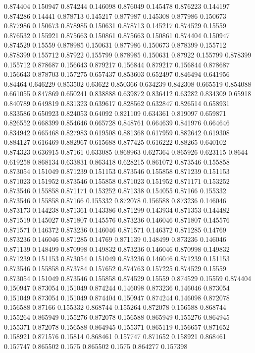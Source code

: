 0.874404 0.150947
0.874244 0.146098
0.876049 0.145478
0.876223 0.144197
0.874286 0.14441
0.878713 0.145217
0.877987 0.145308
0.877986 0.150673
0.877986 0.150673
0.878985 0.150631
0.878713 0.145217
0.874529 0.15559
0.876532 0.155921
0.875663 0.150861
0.875663 0.150861
0.874404 0.150947
0.874529 0.15559
0.878985 0.150631
0.877986 0.150673
0.878399 0.155712
0.878399 0.155712
0.87922 0.155799
0.878985 0.150631
0.87922 0.155799
0.878399 0.155712
0.878687 0.156643
0.879217 0.156844
0.879217 0.156844
0.878687 0.156643
0.878703 0.157275
0.657437 0.853603
0.652497 0.846494
0.641956 0.84464
0.646229 0.853502
0.63622 0.850366
0.634239 0.842308
0.665519 0.854088
0.661055 0.847869
0.650241 0.838888
0.639872 0.836412
0.63282 0.834309
0.65918 0.840789
0.649819 0.831323
0.639617 0.828562
0.632847 0.826514
0.658931 0.833586
0.650923 0.824053
0.64092 0.821109
0.634361 0.819097
0.659871 0.826552
0.668399 0.854646
0.665728 0.848761
0.664639 0.841976
0.664646 0.834942
0.665468 0.827983
0.619508 0.881368
0.617959 0.882642
0.619308 0.884127
0.616469 0.882967
0.615688 0.877425
0.616222 0.88265
0.640102 0.874323
0.636915 0.87161
0.633085 0.868963
0.627364 0.865926
0.623115 0.8644
0.619258 0.868134
0.633831 0.863418
0.628215 0.861072
0.873546 0.155858
0.873054 0.151049
0.871239 0.151153
0.873546 0.155858
0.871239 0.151153
0.871023 0.151952
0.873546 0.155858
0.871023 0.151952
0.871171 0.153252
0.873546 0.155858
0.871171 0.153252
0.871338 0.154055
0.87166 0.155332
0.873546 0.155858
0.87166 0.155332
0.872078 0.156588
0.873236 0.146046
0.873173 0.144238
0.871361 0.143386
0.871299 0.143934
0.871353 0.144482
0.871519 0.145027
0.871807 0.145576
0.873236 0.146046
0.871807 0.145576
0.871571 0.146372
0.873236 0.146046
0.871571 0.146372
0.871285 0.14769
0.873236 0.146046
0.871285 0.14769
0.871139 0.148499
0.873236 0.146046
0.871139 0.148499
0.870998 0.149832
0.873236 0.146046
0.870998 0.149832
0.871239 0.151153
0.873054 0.151049
0.873236 0.146046
0.871239 0.151153
0.873546 0.155858
0.873784 0.157652
0.874763 0.157225
0.874529 0.15559
0.873054 0.151049
0.873546 0.155858
0.874529 0.15559
0.874529 0.15559
0.874404 0.150947
0.873054 0.151049
0.874244 0.146098
0.873236 0.146046
0.873054 0.151049
0.873054 0.151049
0.874404 0.150947
0.874244 0.146098
0.872078 0.156588
0.87166 0.155332
0.868744 0.155264
0.872078 0.156588
0.868744 0.155264
0.865949 0.155276
0.872078 0.156588
0.865949 0.155276
0.864945 0.155371
0.872078 0.156588
0.864945 0.155371
0.865119 0.156657
0.871652 0.158921
0.871576 0.15814
0.868461 0.157747
0.871652 0.158921
0.868461 0.157747
0.865502 0.1575
0.865502 0.1575
0.864277 0.157398
